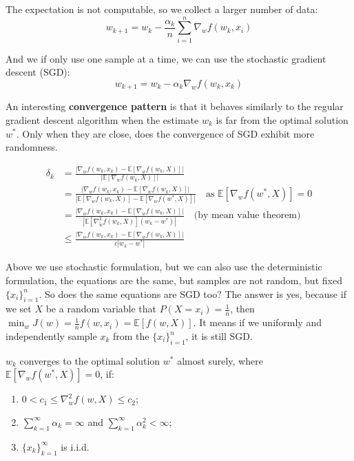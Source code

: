 \documentclass[10pt]{elegantbook}
\begin{document}
The expectation is not computable, so we collect a larger number of data:
\[ w_{k+1} = w_k - \frac{\alpha_k}{n} \sum_{i=1}^{n} \nabla_{w} f(w_k, x_i) \]

And we if only use one sample at a time, we can use the stochastic gradient descent (SGD):
\begin{equation}
    w_{k+1} = w_k - \alpha_k \nabla_{w} f(w_k, x_k)
\end{equation}

An interesting \textbf{convergence pattern} is that it behaves similarly to the regular gradient
descent algorithm when the estimate $w_k$ is far from the optimal solution $w^*$. Only when
they are close, does the convergence of SGD exhibit more randomness.

\begin{align*}
\delta_k &= \frac{\left| \nabla_{w} f(w_k, x_k) - \mathbb{E}\left[\nabla_{w} f(w_k, X)\right] \right|}
                {\left| \mathbb{E}\left[\nabla_{w} f(w_k, X)\right] \right|} \\
&= \frac{\left| \nabla_{w} f(w_k, x_k) - \mathbb{E}\left[\nabla_{w} f(w_k, X)\right] \right|}
         {\left| \mathbb{E}\left[\nabla_{w} f(w_k, X)\right] - \mathbb{E}\left[\nabla_{w} f(w^*, X)\right] \right|} 
         \quad \text{as } \mathbb{E}\left[\nabla_{w} f(w^*, X)\right] = 0 \\
&= \frac{\left| \nabla_{w} f(w_k, x_k) - \mathbb{E}\left[\nabla_{w} f(w_k, X)\right] \right|}
         {\left| \mathbb{E}\left[\nabla^2_{\tilde w} f(w_k, X)\right](w_k - w^*) \right|}
         \quad \text{(by mean value theorem)} \\
&\leq \frac{\left| \nabla_{w} f(w_k, x_k) - \mathbb{E}\left[\nabla_{w} f(w_k, X)\right] \right|}
          {c \left| w_k - w^* \right|}
\end{align*}

Above we use stochastic formulation, but we can also use the deterministic formulation, the equations are the same, but samples are not 
random, but fixed $\{ x_i \}_{i=1}^n$. So does the same equations are SGD too? The answer is yes, because if we set $X$ be a random variable that
$P(X = x_i) = \frac{1}{n}$, then $\min_w J(w) = \frac{1}{n} f(w, x_i) = \mathbb E[f(w, X)]$.
It means if we uniformly and independently sample $x_k$ from the $\{ x_i \}_{i=1}^n$, it is still SGD.

\begin{theorem}
    $w_k$ converges to the optimal solution $w^*$ almost surely, where $\mathbb{E}\left[\nabla_{w} f(w^*, X)\right] = 0$, if:
    \begin{enumerate}
        \item $0 < c_1 \leq \nabla_w^2 f(w, X) \leq c_2$;
        \item $\sum_{k=1}^{\infty} \alpha_k = \infty$ and $\sum_{k=1}^{\infty} \alpha_k^2 < \infty$;
        \item $\{ x_k \}_{k=1}^{\infty}$ is i.i.d.
    \end{enumerate}
\end{theorem}
\end{document}
